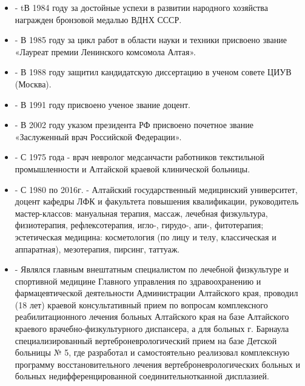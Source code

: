 \begin{itemize}
\item - tВ 1984 году за достойные успехи в развитии народного хозяйства награжден бронзовой медалью ВДНХ СССР.

\item - В 1985 году за цикл работ в области науки и техники присвоено звание «Лауреат премии Ленинского комсомола Алтая».

\item - В 1988 году защитил кандидатскую диссертацию в ученом совете ЦИУВ (Москва).

\item - В 1991 году присвоено ученое звание доцент.

\item - В 2002 году указом президента РФ присвоено почетное звание «Заслуженный врач Российской Федерации».

\item - С 1975 года - врач невролог медсанчасти работников текстильной промышленности и Алтайской краевой клинической больницы.

\item - С 1980 по 2016г. - Алтайский государственный медицинский университет, доцент кафедры ЛФК и факультета повышения квалификации, руководитель мастер-классов: мануальная терапия, массаж, лечебная физкультура, физиотерапия, рефлексотерапия, игло-, гирудо-, апи-, фитотерапия; эстетическая медицина: косметология (по лицу и телу, классическая и аппаратная), мезотерапия, пирсинг, таттуаж.

\item - Являлся главным внештатным специалистом по лечебной физкультуре и спортивной
медицине Главного управления по здравоохранению и фармацевтической деятельности
Администрации Алтайского края, проводил (18 лет) краевой консультативный прием
по вопросам комплексного реабилитационного лечения больных Алтайского края на
базе Алтайского краевого врачебно-физкультурного диспансера, а для больных г.
Барнаула специализированный вертеброневрологический прием на базе Детской
больницы № 5, где разработал и самостоятельно реализовал комплексную программу
восстановительного лечения вертеброневрологических больных и больных
недифференцированной соединительнотканной дисплазией.
\end{itemize}
